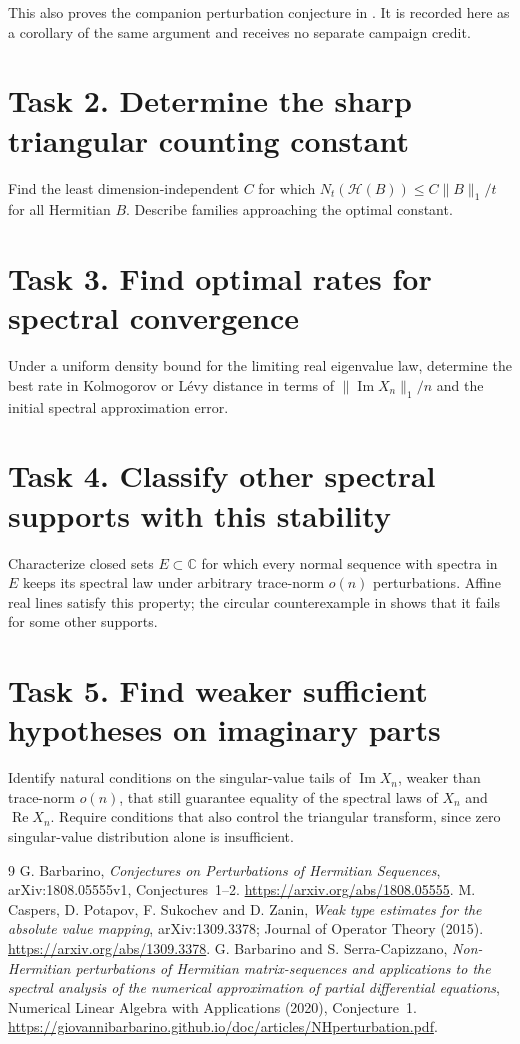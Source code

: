 \documentclass[11pt]{article}
\newcommand{\Rea}{\operatorname{Re}}
\newcommand{\Ima}{\operatorname{Im}}
\newcommand{\HH}{\mathcal H}
\begin{document}
This also proves the companion perturbation conjecture in
\cite{Barbarino,BS}. It is recorded here as a corollary of the same
argument and receives no separate campaign credit.

\section*{Task 2. Determine the sharp triangular counting constant}
Find the least dimension-independent \(C\) for which
\(N_t(\HH(B))\le C\|B\|_1/t\) for all Hermitian \(B\).
Describe families approaching the optimal constant.

\section*{Task 3. Find optimal rates for spectral convergence}
Under a uniform density bound for the limiting real eigenvalue law,
determine the best rate in Kolmogorov or L\'evy distance in terms of
\(\|\Ima X_n\|_1/n\) and the initial spectral approximation error.

\section*{Task 4. Classify other spectral supports with this stability}
Characterize closed sets \(E\subset\mathbb C\) for which every normal
sequence with spectra in \(E\) keeps its spectral law under arbitrary
trace-norm \(o(n)\) perturbations. Affine real lines satisfy this
property; the circular counterexample in \cite{Barbarino} shows that
it fails for some other supports.

\section*{Task 5. Find weaker sufficient hypotheses on imaginary parts}
Identify natural conditions on the singular-value tails of
\(\Ima X_n\), weaker than trace-norm \(o(n)\), that still guarantee
equality of the spectral laws of \(X_n\) and \(\Rea X_n\).
Require conditions that also control the triangular transform, since
zero singular-value distribution alone is insufficient.

\begin{thebibliography}{9}
G. Barbarino, \emph{Conjectures on Perturbations of Hermitian Sequences},
arXiv:1808.05555v1, Conjectures~1--2.
\url{https://arxiv.org/abs/1808.05555}.
M. Caspers, D. Potapov, F. Sukochev and D. Zanin,
\emph{Weak type estimates for the absolute value mapping},
arXiv:1309.3378; Journal of Operator Theory (2015).
\url{https://arxiv.org/abs/1309.3378}.
G. Barbarino and S. Serra-Capizzano,
\emph{Non-Hermitian perturbations of Hermitian matrix-sequences and
applications to the spectral analysis of the numerical approximation
of partial differential equations}, Numerical Linear Algebra with
Applications (2020), Conjecture~1.
\url{https://giovannibarbarino.github.io/doc/articles/NHperturbation.pdf}.
\end{thebibliography}
\end{document}
